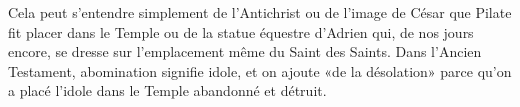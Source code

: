 Cela peut s'entendre simplement de l'Antichrist
	ou de l'image de César que Pilate fit placer dans le Temple
	ou de la statue équestre d'Adrien qui, de nos jours encore,
		se dresse sur l'emplacement même du Saint des Saints.
Dans l'Ancien Testament, abomination signifie idole,
	et on ajoute «de la désolation»
	parce qu'on a placé l'idole dans le Temple abandonné et détruit.
